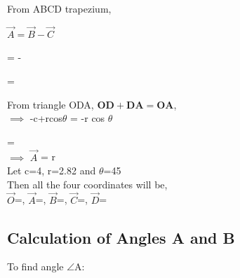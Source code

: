 \documentclass[journal,10pt,twocolumn]{article}
\begin{document}
\begin{flushleft}
\vspace{0.35cm}
\begin{flushleft}
From ABCD trapezium, \\
\end{flushleft}
\begin{center}
$\vec{A} =\vec{B}-  \vec{C}$\\
\end{center}

\center
\vspace{0.4cm}
=  - 
   
\endcenter{}
		= 
	\\
\vspace{0.3cm}
\begin{flushleft}
From triangle ODA,
$\boldsymbol{OD+DA=OA}$, \\
\vspace{0.2cm} 
$\implies$ -c+rcos$\theta$ = -r cos $\theta$\\
\end{flushleft}
\vspace{0.35cm}
	=  \\
\endcenter{}
	$\implies$ $\vec{A}$
	= r \\

Let c=4, r=2.82 and $\theta$=45 \textdegree \\

Then all the four coordinates will be, \\

\vspace{0.3cm}
$\vec{O}$=, $\vec{A}$=, $\vec{B}$=, $\vec{C}$=, $\vec{D}$=
\\

\subsection{Calculation of Angles A and B}
\vspace{0.25cm}
To find angle $\angle$A:\\


\end{flushleft}
\end{document}
